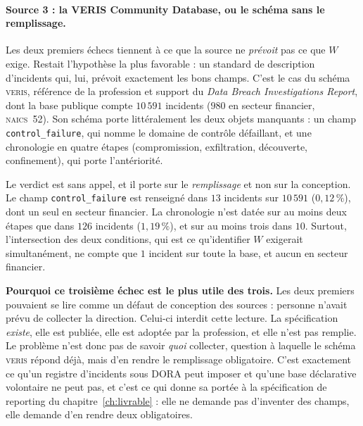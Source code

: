 \paragraph{Source 3 : la VERIS Community Database, ou le schéma sans le remplissage.}
Les deux premiers échecs tiennent à ce que la source ne \emph{prévoit} pas ce que $W$ exige.
Restait l'hypothèse la plus favorable : un standard de description d'incidents qui, lui,
prévoit exactement les bons champs. C'est le cas du schéma \textsc{veris}, référence de la
profession et support du \emph{Data Breach Investigations Report}, dont la base publique
compte $10\,591$ incidents ($980$ en secteur financier, \textsc{naics}~52). Son schéma porte
littéralement les deux objets manquants : un champ \texttt{control\_failure}, qui nomme le
domaine de contrôle défaillant, et une chronologie en quatre étapes
(compromission, exfiltration, découverte, confinement), qui porte l'antériorité.

Le verdict est sans appel, et il porte sur le \emph{remplissage} et non sur la conception.
Le champ \texttt{control\_failure} est renseigné dans $13$ incidents sur $10\,591$
($0{,}12\,\%$), dont un seul en secteur financier. La chronologie n'est datée sur au
moins deux étapes que dans $126$ incidents ($1{,}19\,\%$), et sur au moins trois dans $10$.
Surtout, l'intersection des deux conditions, qui est ce qu'identifier $W$ exigerait
simultanément, ne compte que $1$ incident sur toute la base, et aucun en
secteur financier.

\begin{cle}
\textbf{Pourquoi ce troisième échec est le plus utile des trois.} Les deux premiers pouvaient
se lire comme un défaut de conception des sources : personne n'avait prévu de collecter la
direction. Celui-ci interdit cette lecture. La spécification \emph{existe}, elle est publiée,
elle est adoptée par la profession, et elle n'est pas remplie. Le problème n'est donc
pas de savoir \emph{quoi} collecter, question à laquelle le schéma \textsc{veris} répond déjà,
mais d'en rendre le remplissage obligatoire. C'est exactement ce qu'un registre
d'incidents sous DORA peut imposer et qu'une base déclarative volontaire ne peut pas, et c'est
ce qui donne sa portée à la spécification de reporting du chapitre~\ref{ch:livrable} : elle
ne demande pas d'inventer des champs, elle demande d'en rendre deux obligatoires.
\end{cle}



